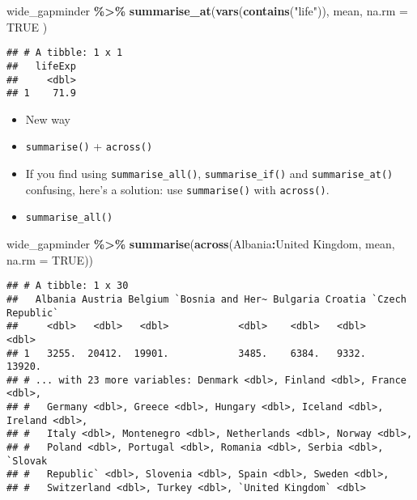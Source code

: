 \documentclass[
]{book}
\newenvironment{Shaded}{\begin{snugshade}}{\end{snugshade}}
\newcommand{\DataTypeTok}[1]{\textcolor[rgb]{0.13,0.29,0.53}{#1}}
\newcommand{\KeywordTok}[1]{\textcolor[rgb]{0.13,0.29,0.53}{\textbf{#1}}}
\newcommand{\NormalTok}[1]{#1}
\newcommand{\OperatorTok}[1]{\textcolor[rgb]{0.81,0.36,0.00}{\textbf{#1}}}
\newcommand{\OtherTok}[1]{\textcolor[rgb]{0.56,0.35,0.01}{#1}}
\newcommand{\StringTok}[1]{\textcolor[rgb]{0.31,0.60,0.02}{#1}}
\begin{document}
\begin{Shaded}
\begin{Highlighting}[]
\NormalTok{wide\_gapminder }\OperatorTok{\%\textgreater{}\%}
\StringTok{  }\KeywordTok{summarise\_at}\NormalTok{(}\KeywordTok{vars}\NormalTok{(}\KeywordTok{contains}\NormalTok{(}\StringTok{"life"}\NormalTok{)),}
\NormalTok{    mean,}
    \DataTypeTok{na.rm =} \OtherTok{TRUE}
\NormalTok{  )}
\end{Highlighting}
\end{Shaded}

\begin{verbatim}
## # A tibble: 1 x 1
##   lifeExp
##     <dbl>
## 1    71.9
\end{verbatim}

\begin{itemize}
\item
  New way
\item
  \texttt{summarise()} + \texttt{across()}
\item
  If you find using \texttt{summarise\_all()}, \texttt{summarise\_if()} and \texttt{summarise\_at()} confusing, here's a solution: use \texttt{summarise()} with \texttt{across()}.
\item
  \texttt{summarise\_all()}
\end{itemize}

\begin{Shaded}
\begin{Highlighting}[]
\NormalTok{wide\_gapminder }\OperatorTok{\%\textgreater{}\%}
\StringTok{  }\KeywordTok{summarise}\NormalTok{(}\KeywordTok{across}\NormalTok{(Albania}\OperatorTok{:}\StringTok{\textasciigrave{}}\DataTypeTok{United Kingdom}\StringTok{\textasciigrave{}}\NormalTok{, mean, }\DataTypeTok{na.rm =} \OtherTok{TRUE}\NormalTok{))}
\end{Highlighting}
\end{Shaded}

\begin{verbatim}
## # A tibble: 1 x 30
##   Albania Austria Belgium `Bosnia and Her~ Bulgaria Croatia `Czech Republic`
##     <dbl>   <dbl>   <dbl>            <dbl>    <dbl>   <dbl>            <dbl>
## 1   3255.  20412.  19901.            3485.    6384.   9332.           13920.
## # ... with 23 more variables: Denmark <dbl>, Finland <dbl>, France <dbl>,
## #   Germany <dbl>, Greece <dbl>, Hungary <dbl>, Iceland <dbl>, Ireland <dbl>,
## #   Italy <dbl>, Montenegro <dbl>, Netherlands <dbl>, Norway <dbl>,
## #   Poland <dbl>, Portugal <dbl>, Romania <dbl>, Serbia <dbl>, `Slovak
## #   Republic` <dbl>, Slovenia <dbl>, Spain <dbl>, Sweden <dbl>,
## #   Switzerland <dbl>, Turkey <dbl>, `United Kingdom` <dbl>
\end{verbatim}
\end{document}
